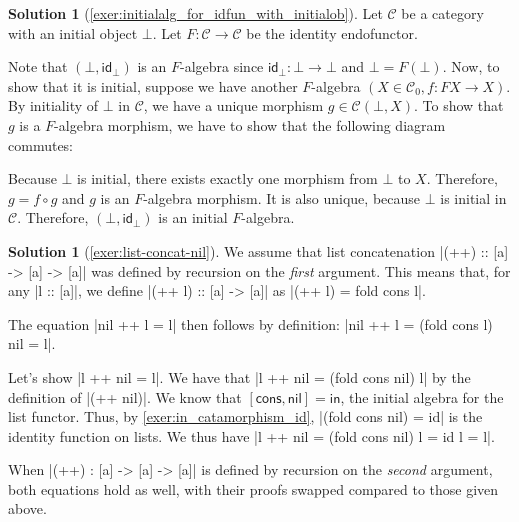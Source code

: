 \documentclass[a4paper,11pt, oneside,titlepage=false]{scrbook}
\theoremstyle{plain}
\theoremstyle{definition}
\newtheorem{solution}[thm]{Solution}
\newcommand{\cfont}[1]{\ensuremath{\mathsf{#1}}}
\newcommand{\Cat}[1]{\mathcal{#1}}
\newcommand{\CC}{\Cat{C}}
\newcommand{\Ob}[1]{{#1}_0}
\newcommand{\Id}[1][]{\cfont{id}_{#1}}
\newcommand{\In}{\ensuremath{\mathsf{in}}}
\newcommand{\nil}{\ensuremath{\mathsf{nil}}}
\newcommand{\cons}{\ensuremath{\mathsf{cons}}}
\begin{document}
\begin{solution}[\cref{exer:initialalg_for_idfun_with_initialob}]\label{sol:initialalg_for_idfun_with_initialob}
	Let $\CC$ be a category with an initial object $\bot$. Let $ F: \CC \to \CC $ be the identity endofunctor.

	Note that $ (\bot, \Id[\bot]) $ is an $ F $-algebra since $ \Id[\bot]: \bot \to \bot $ and $ \bot = F(\bot) $. Now, to show that it is initial, suppose we have another $ F $-algebra $ (X \in \Ob \CC, f: F X \to X) $. By initiality of $ \bot $ in $ \CC $, we have a unique morphism $ g \in \CC(\bot, X) $. To show that $ g $ is a $ F $-algebra morphism, we have to show that the following diagram commutes:
	\begin{center}
	\end{center}
	Because $ \bot $ is initial, there exists exactly one morphism from $ \bot $ to $ X $. Therefore, $ g = f \circ g $ and $ g $ is an $ F $-algebra morphism. It is also unique, because $ \bot $ is initial in $ \CC $. Therefore, $ (\bot, \Id[\bot]) $ is an initial $ F $-algebra.
\end{solution}


\begin{solution}[\cref{exer:list-concat-nil}]\label{sol:list-concat-nil}
  We assume that list concatenation |(++) :: [a] -> [a] -> [a]| was defined by recursion on the \emph{first} argument.
  This means that, for any |l :: [a]|, we define |(++ l) :: [a] -> [a]| as |(++ l) = fold cons l|.

  The equation |nil ++ l = l| then follows by definition: |nil ++ l = (fold cons l) nil = l|.

  Let's show |l ++ nil = l|.
  We have that |l ++ nil = (fold cons nil) l| by the definition of |(++ nil)|.
  We know that $[\cons,\nil] = \In$, the initial algebra for the list functor.
  Thus, by \cref{exer:in_catamorphism_id}, |(fold cons nil) = id| is the identity function on lists.
  We thus have |l ++ nil = (fold cons nil) l = id l = l|.

  When |(++) : [a] -> [a] -> [a]| is defined by recursion on the \emph{second} argument, both equations hold as well, with their proofs swapped compared to those given above.
\end{solution}
\end{document}
